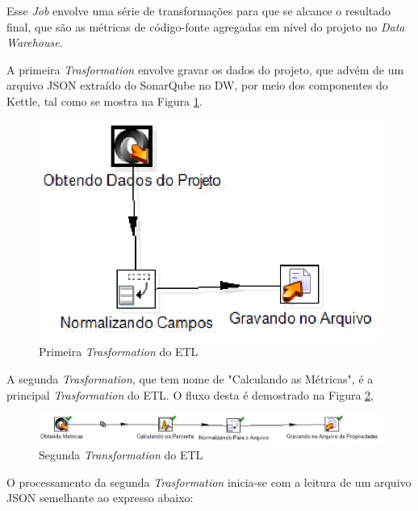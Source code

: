 \begin{apendicesenv}
Esse \textit{Job} envolve uma série de transformações para que se alcance o resultado final, que são as métricas de código-fonte agregadas em nível do projeto no \textit{Data Warehouse}.


A primeira \textit{Trasformation} envolve gravar os dados do projeto, que advém de um arquivo JSON extraído do SonarQube no DW, por meio dos componentes do Kettle, tal como se mostra na Figura \ref{first}.


\begin{figure}[ht!]
\centering
\includegraphics[keepaspectratio=false,scale=0.8]{figuras/first.eps}
\caption{Primeira \textit{Trasformation} do ETL}
\label{first}
\end{figure}
\FloatBarrier



A segunda \textit{Trasformation}, que tem nome de  "Calculando as Métricas", é a principal \textit{Trasformation} do ETL. O fluxo desta é demostrado na Figura \ref{segundatransformation}, 

\begin{figure}[ht!]
\centering
\includegraphics[keepaspectratio=false,scale=0.75]{figuras/fluxoarquivo.eps}
\caption{Segunda \textit{Transformation} do ETL}
\label{segundatransformation}
\end{figure}
\FloatBarrier



O processamento da segunda \textit{Trasformation} inicia-se com a leitura de um arquivo JSON semelhante ao expresso abaixo:





\end{apendicesenv}
